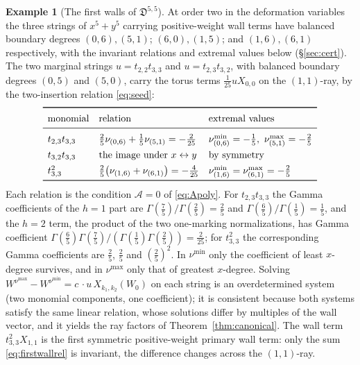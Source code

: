 \documentclass[11pt]{amsart}
\theoremstyle{definition}
\newtheorem{example}[theorem]{Example}
\theoremstyle{remark}
\newcommand{\Dscr}{\mathfrak{D}}
\newcommand{\Ascr}{\mathcal{A}}
\begin{document}
\begin{example}[The first walls of $\Dscr^{5,5}$]
\label{ex:walls}
At order two in the deformation variables the three strings of
$x^{5}+y^{5}$ carrying positive-weight wall terms have balanced boundary degrees
$(0,6),(5,1)$; $(6,0),(1,5)$; and $(1,6),(6,1)$ respectively, with the
invariant relations and extremal values below (\S\ref{sec:cert}).  The two
marginal strings $u=t_{2,2}t_{3,3}$ and $u=t_{2,3}t_{3,2}$, with balanced
boundary degrees $(0,5)$ and $(5,0)$, carry the torus terms $\tfrac1{25}uX_{0,0}$
on the $(1,1)$-ray, by the two-insertion relation \eqref{eq:seed}:
{\small
\[
\renewcommand{\arraystretch}{1.35}
\begin{array}{lll}
\toprule
\text{monomial} & \text{relation} & \text{extremal values}\\
\midrule
t_{2,3}t_{3,3} &
\tfrac25\nu_{(0,6)}+\tfrac15\nu_{(5,1)}=-\tfrac2{25} &
\nu^{\min}_{(0,6)}=-\tfrac15,\ \nu^{\max}_{(5,1)}=-\tfrac25\\
t_{3,2}t_{3,3} & \text{the image under $x\leftrightarrow y$} & \text{by symmetry}\\
t_{3,3}^{2} &
\tfrac25\bigl(\nu_{(1,6)}+\nu_{(6,1)}\bigr)=-\tfrac4{25} &
\nu^{\min}_{(1,6)}=\nu^{\max}_{(6,1)}=-\tfrac25\\
\bottomrule
\end{array}
\]
}
Each relation is the condition $\Ascr=0$ of \eqref{eq:Apoly}.  For
$t_{2,3}t_{3,3}$ the Gamma coefficients of the $h=1$ part are
$\Gamma(\tfrac75)/\Gamma(\tfrac25)=\tfrac25$ and
$\Gamma(\tfrac65)/\Gamma(\tfrac15)=\tfrac15$, and the $h=2$ term, the product
of the two one-marking normalizations, has Gamma coefficient
$\Gamma(\tfrac65)\Gamma(\tfrac75)/(\Gamma(\tfrac15)\Gamma(\tfrac25))=\tfrac2{25}$;
for $t_{3,3}^{2}$ the corresponding Gamma coefficients are $\tfrac25$, $\tfrac25$ and
$(\tfrac25)^2$.  In $\nu^{\min}$ only the coefficient of least $x$-degree
survives, and in $\nu^{\max}$ only that of greatest $x$-degree.  Solving
$W^{\nu^{\max}}-W^{\nu^{\min}}=c\,\cdot u\,X_{k_{1},k_{2}}(W_{0})$ on each
string is an overdetermined system (two monomial components, one
coefficient); it is consistent because both systems satisfy the same linear
relation, whose solutions differ by multiples of the wall vector, and it
yields the ray factors of Theorem~\ref{thm:canonical}. The wall term
$t_{3,3}^{2}X_{1,1}$ is the first symmetric positive-weight primary wall term:
only the sum \eqref{eq:firstwallrel} is invariant,
the difference changes across the $(1,1)$-ray.
\end{example}
\end{document}
